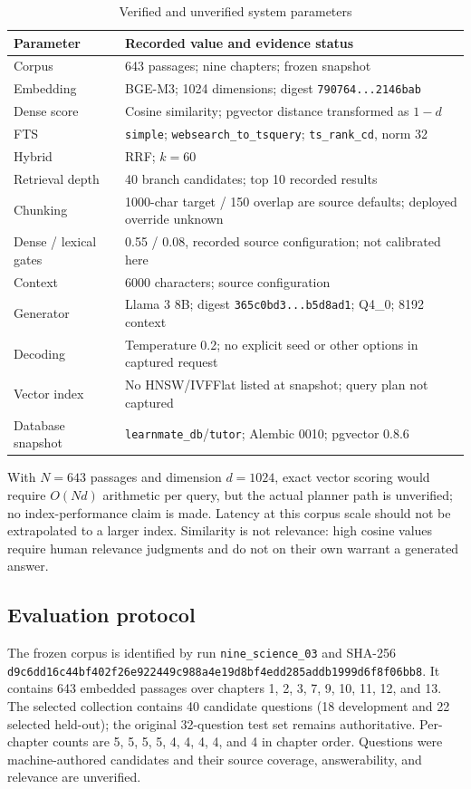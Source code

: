 \documentclass[conference]{IEEEtran}
\begin{document}
\begin{table}[t]
\caption{Verified and unverified system parameters}
\label{tab:parameters}
\centering\footnotesize
\begin{tabular}{p{}p{}}
\hline
Parameter & Recorded value and evidence status\\ \hline
Corpus & 643 passages; nine chapters; frozen snapshot\\
Embedding & BGE-M3; 1024 dimensions; digest \texttt{790764...2146bab}\\
Dense score & Cosine similarity; pgvector distance transformed as $1-d$\\
FTS & \texttt{simple}; \texttt{websearch\_to\_tsquery}; \texttt{ts\_rank\_cd}, norm 32\\
Hybrid & RRF; $k=60$\\
Retrieval depth & 40 branch candidates; top 10 recorded results\\
Chunking & 1000-char target / 150 overlap are source defaults; deployed override unknown\\
Dense / lexical gates & 0.55 / 0.08, recorded source configuration; not calibrated here\\
Context & 6000 characters; source configuration\\
Generator & Llama 3 8B; digest \texttt{365c0bd3...b5d8ad1}; Q4\_0; 8192 context\\
Decoding & Temperature 0.2; no explicit seed or other options in captured request\\
Vector index & No HNSW/IVFFlat listed at snapshot; query plan not captured\\
Database snapshot & \texttt{learnmate\_db}/\texttt{tutor}; Alembic 0010; pgvector 0.8.6\\
\hline
\end{tabular}
\end{table}

With $N=643$ passages and dimension $d=1024$, exact vector scoring would require $O(Nd)$ arithmetic per query, but the actual planner path is unverified; no index-performance claim is made. Latency at this corpus scale should not be extrapolated to a larger index. Similarity is not relevance: high cosine values require human relevance judgments and do not on their own warrant a generated answer.

\subsection{Evaluation protocol}
The frozen corpus is identified by run \texttt{nine\_science\_03} and SHA-256 \texttt{d9c6dd16c44bf402f26e922449c988a4e19d8bf4edd285addb1999d6f8f06bb8}. It contains 643 embedded passages over chapters 1, 2, 3, 7, 9, 10, 11, 12, and 13. The selected collection contains 40 candidate questions (18 development and 22 selected held-out); the original 32-question test set remains authoritative. Per-chapter counts are 5, 5, 5, 5, 4, 4, 4, 4, and 4 in chapter order. Questions were machine-authored candidates and their source coverage, answerability, and relevance are unverified.
\end{document}
